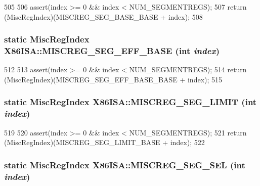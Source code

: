 \begin{DoxyCode}
505     {
506         assert(index >= 0 && index < NUM_SEGMENTREGS);
507         return (MiscRegIndex)(MISCREG_SEG_BASE_BASE + index);
508     }
\end{DoxyCode}
\hypertarget{namespaceX86ISA_a48969e78833727c474e77163559d3cc0}{
\subsubsection[{MISCREG\_\-SEG\_\-EFF\_\-BASE}]{\setlength{\rightskip}{0pt plus 5cm}static {\bf MiscRegIndex} X86ISA::MISCREG\_\-SEG\_\-EFF\_\-BASE (int {\em index})}}
\label{namespaceX86ISA_a48969e78833727c474e77163559d3cc0}



\begin{DoxyCode}
512     {
513         assert(index >= 0 && index < NUM_SEGMENTREGS);
514         return (MiscRegIndex)(MISCREG_SEG_EFF_BASE_BASE + index);
515     }
\end{DoxyCode}
\hypertarget{namespaceX86ISA_af93c7fd7ac0d329975952ac0c2a97f98}{
\subsubsection[{MISCREG\_\-SEG\_\-LIMIT}]{\setlength{\rightskip}{0pt plus 5cm}static {\bf MiscRegIndex} X86ISA::MISCREG\_\-SEG\_\-LIMIT (int {\em index})}}
\label{namespaceX86ISA_af93c7fd7ac0d329975952ac0c2a97f98}



\begin{DoxyCode}
519     {
520         assert(index >= 0 && index < NUM_SEGMENTREGS);
521         return (MiscRegIndex)(MISCREG_SEG_LIMIT_BASE + index);
522     }
\end{DoxyCode}
\hypertarget{namespaceX86ISA_a7a287359d6688cb50477df97dcbdd196}{
\subsubsection[{MISCREG\_\-SEG\_\-SEL}]{\setlength{\rightskip}{0pt plus 5cm}static {\bf MiscRegIndex} X86ISA::MISCREG\_\-SEG\_\-SEL (int {\em index})}}
\label{namespaceX86ISA_a7a287359d6688cb50477df97dcbdd196}



